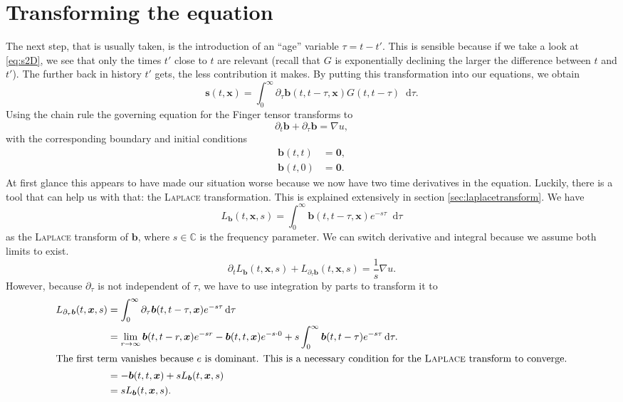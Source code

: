\documentclass[12pt,a4paper,twoside, open=right]{scrreprt}
\theoremstyle{definition}
\theoremstyle{plain}
\newcommand{\cc}{\mathbb{C}}
\newcommand{\bfb}{\bm{b}}
\newcommand{\bfs}{\bm{s}}
\newcommand{\bfx}{\bm{x}}
\newcommand{\D}{\mathop{}\!\mathrm{d}}
\begin{document}
\section{Transforming the equation}
The next step, that is usually taken, is the introduction of an \enquote{age} variable $\tau=t-t'$. This is sensible because if we take a look at \eqref{eq:s2D}, we see that only the times $t'$ close to $t$ are relevant (recall that $G$ is exponentially declining the larger the difference between $t$ and $t'$). The further back in history $t'$ gets, the less contribution it makes. By putting this transformation into our equations, we obtain
\begin{equation}
    \bfs(t,\bfx)=\int_0^\infty\partial_\tau\bfb(t,t-\tau,\bfx)G(t,t-\tau)\D\tau.\label{eq:sage}
\end{equation}
Using the chain rule the governing equation for the Finger tensor transforms to  
\begin{equation}
    \partial_t \bfb +\partial_\tau\bfb = \nabla u,
\end{equation}
with the corresponding boundary and initial conditions
\begin{align}
    \bfb(t,t) &= \bm{0},\\
    \bfb(t,0) &= \bm{0}.
\end{align}
At first glance this appears to have made our situation worse because we now have two time derivatives in the equation. Luckily, there is a tool that can help us with that: the \textsc{Laplace} transformation. This is explained extensively in section \ref{sec:laplacetransform}. We have
\begin{equation}
L_{\bfb}(t,\bfx,s) =\int_0^\infty\bfb(t,t-\tau,\bfx)e^{-s\tau}\D\tau
\end{equation}
as the \textsc{Laplace} transform of $\bfb$, where $s\in\cc$ is the frequency parameter. 
We can switch derivative and integral because we assume both limits to exist.
\begin{equation}
    \partial_tL_{\bfb}(t,\bfx,s) + L_{\partial_\tau\bfb}(t,\bfx,s) = \frac{1}{s}\nabla u.
\end{equation}
However, because $\partial_\tau$ is not independent of $\tau$, we have to use integration by parts to transform it to
\begin{align}
    L_{\partial_\tau\bfb}(t,\bfx,s) &= \int_0^\infty\partial_\tau\bfb(t,t-\tau,\bfx)e^{-s\tau}\D\tau\\ &=\lim_{r\to\infty}\bfb(t,t-r,\bfx)e^{-sr}-\bfb(t,t,\bfx)e^{-s\cdot 0}+s\int_0^\infty\bfb(t,t-\tau)e^{-s\tau}\D\tau.\\
    \intertext{The first term vanishes because $e$ is dominant. This is a necessary condition for the \textsc{Laplace} transform to converge.}
    &= -\bfb(t,t,\bfx) +sL_{\bfb}(t,\bfx, s)\\
    &= sL_{\bfb}(t,\bfx,s).
\end{align}
\end{document}
